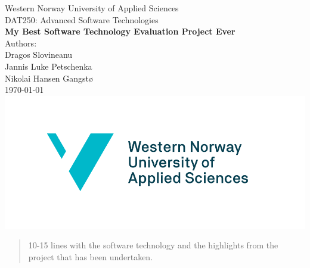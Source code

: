 \documentclass[11pt]{article}
\begin{document}
\begin{titlepage}
    \centering
    {\Large{Western Norway University of Applied Sciences}}\\[1em] 
    {\Large DAT250: Advanced Software Technologies \\[1em]}
    \vspace{1cm}
    {\Huge \textbf{My Best Software Technology Evaluation Project Ever}}\\[2em]
    \vspace{1cm}
    {\Large Authors:}\\[0.5em]
    {\large Dragos Slovineanu  \\ Jannis Luke Petschenka
 \\ Nikolai Hansen Gangstø}\\[5em]
    {\large \today}\\[3em]
    \vspace*{1cm}
    \includegraphics[scale=.25]{figs/HVL_logo_En_cmyk.png}
    \vspace{2cm}
    \vfill
\end{titlepage}

\begin{abstract}

  10-15 lines with the software technology and the highlights from the
  project that has been undertaken.

\end{abstract}

%















{}
\end{document}
